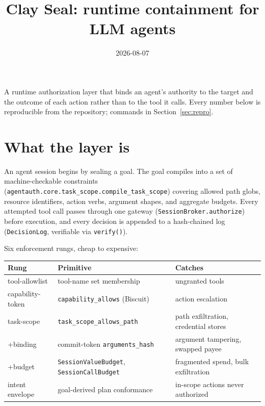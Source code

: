 \documentclass[11pt]{article}
\title{\vspace{-2em}Clay Seal: runtime containment for LLM agents}
\author{}
\date{2026-08-07}
\begin{document}
\maketitle
\vspace{-3em}

A runtime authorization layer that binds an agent's authority to the target and
the outcome of each action rather than to the tool it calls. Every number below
is reproducible from the repository; commands in Section~\ref{sec:repro}.

\section{What the layer is}

An agent session begins by sealing a goal. The goal compiles into a set of
machine-checkable constraints (\texttt{agentauth.core.task\_scope.compile\_task\_scope})
covering allowed path globs, resource identifiers, action verbs, argument
shapes, and aggregate budgets. Every attempted tool call passes through one
gateway (\texttt{SessionBroker.authorize}) before execution, and every decision
is appended to a hash-chained log (\texttt{DecisionLog}, verifiable via
\texttt{verify()}).

Six enforcement rungs, cheap to expensive:

\begin{center}
\small
\begin{tabular}{@{}p{}p{}p{}@{}}
\toprule
\textbf{Rung} & \textbf{Primitive} & \textbf{Catches} \\
\midrule
tool-allowlist & tool-name set membership & ungranted tools \\
capability-token & \texttt{capability\_allows} (Biscuit) & action escalation \\
task-scope & \texttt{task\_scope\_allows\_path} & path exfiltration, credential stores \\
\quad +binding & commit-token \texttt{arguments\_hash} & argument tampering, swapped payee \\
\quad +budget & \texttt{SessionValueBudget}, \texttt{SessionCallBudget} & fragmented spend, bulk exfiltration \\
intent envelope & goal-derived plan conformance & in-scope actions never authorized \\
\bottomrule
\end{tabular}
\end{center}
\end{document}

